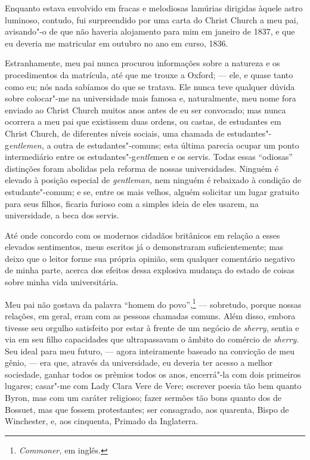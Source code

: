 Enquanto estava envolvido em fracas e melodiosas lamúrias dirigidas
àquele astro luminoso, contudo, fui surpreendido por uma carta do Christ
Church a meu pai, avisando"-o de que não haveria alojamento para mim em
janeiro de 1837, e que eu deveria me matricular em outubro no ano em
curso, 1836.

Estranhamente, meu pai nunca procurou informações sobre a natureza e os
procedimentos da matrícula, até que me trouxe a Oxford; --- ele, e quase
tanto como eu; nós nada sabíamos do que se tratava. Ele nunca teve
qualquer dúvida sobre colocar"-me na universidade mais famosa e,
naturalmente, meu nome fora enviado ao Christ Church muitos anos antes
de eu ser convocado; mas nunca ocorrera a meu pai que existissem duas
ordens, ou castas, de estudantes em Christ Church, de diferentes níveis
sociais, uma chamada de estudantes"-g\textit{entlemen,} a outra de
estudantes"-comuns; esta última parecia ocupar um ponto intermediário
entre os estudantes"-g\textit{entle}men e os servis. Todas essas
``odiosas'' distinções foram abolidas pela reforma de nossas
universidades. Ninguém é elevado à posição especial de \textit{gentleman,}
nem ninguém é rebaixado à condição de estudante"-comum; e se, entre os
mais velhos, alguém solicitar um lugar gratuito para seus filhos,
ficaria furioso com a simples ideia de eles usarem, na universidade, a
beca dos servis.

Até onde concordo com os modernos cidadãos britânicos em relação a
esses elevados sentimentos, meus escritos já o demonstraram
suficientemente; mas deixo que o leitor forme sua própria opinião, sem
qualquer comentário negativo de minha parte, acerca dos efeitos dessa
explosiva mudança do estado de coisas sobre minha vida universitária.

Meu pai não gostava da palavra ``homem do povo'',\footnote{\textit{Commoner,}
  em inglês.} --- sobretudo, porque nossas relações, em
geral, eram com as pessoas chamadas comuns. Além disso, embora tivesse
seu orgulho satisfeito por estar à frente de um negócio de
\textit{sherry}, sentia e via em seu filho capacidades que ultrapassavam o
âmbito do comércio de \textit{sherry}. Seu ideal para meu futuro, --- agora
inteiramente baseado na convicção de meu gênio, --- era que, através da
universidade, eu deveria ter acesso a melhor sociedade, ganhar todos os
prêmios todos os anos, encerrá"-la com dois primeiros lugares; casar"-me
com Lady Clara Vere de Vere; escrever poesia tão bem quanto Byron, mas \label{212}
com um caráter religioso; fazer sermões tão bons quanto dos de Bossuet,
mas que fossem protestantes; ser consagrado, aos quarenta, Bispo de
Winchester, e, aos cinquenta, Primado da Inglaterra.

